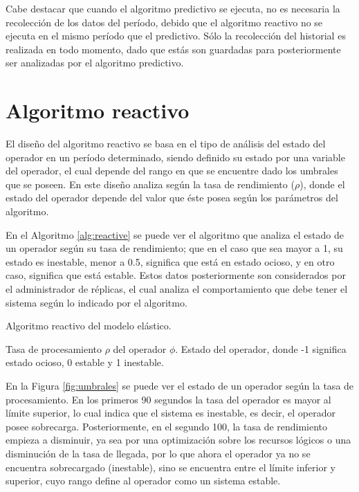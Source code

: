 Cabe destacar que cuando el algoritmo predictivo se ejecuta, no es necesaria la recolección de los datos del período, debido que el algoritmo reactivo no se ejecuta en el mismo período que el predictivo. Sólo la recolección del historial es realizada en todo momento, dado que estás son guardadas para posteriormente ser analizadas por el algoritmo predictivo.

\section{Algoritmo reactivo}
El diseño del algoritmo reactivo se basa en el tipo de análisis del estado del operador en un período determinado, siendo definido su estado por una variable del operador, el cual depende del rango en que se encuentre dado los umbrales que se poseen. En este diseño analiza según la tasa de rendimiento ($\rho$), donde el estado del operador depende del valor que éste posea según los parámetros del algoritmo.

En el Algoritmo \ref{alg:reactive} se puede ver el algoritmo que analiza el estado de un operador según su tasa de rendimiento; que en el caso que sea mayor a 1, su estado es inestable, menor a 0.5, significa que está en estado ocioso, y en otro caso, significa que está estable. Estos datos posteriormente son considerados por el administrador de réplicas, el cual analiza el comportamiento que debe tener el sistema según lo indicado por el algoritmo.

\begin{algorithm}[!ht]
	\caption{Algoritmo reactivo del modelo elástico.}
	\label{alg:reactive}
	\begin{algorithmic}[1]
	\REQUIRE Tasa de procesamiento $\rho$ del operador $\phi$.
	\ENSURE Estado del operador, donde -1 significa estado ocioso, 0 estable y 1 inestable.
	\ELSE
	\ENDIF
	\end{algorithmic}
\end{algorithm}

En la Figura \ref{fig:umbrales} se puede ver el estado de un operador según la tasa de procesamiento. En los primeros 90 segundos la tasa del operador es mayor al límite superior, lo cual indica que el sistema es inestable, es decir, el operador posee sobrecarga. Posteriormente, en el segundo 100, la tasa de rendimiento empieza a disminuir, ya sea por una optimización sobre los recursos lógicos o una disminución de la tasa de llegada, por lo que ahora el operador ya no se encuentra sobrecargado (inestable), sino se encuentra entre el límite inferior y superior, cuyo rango define al operador como un sistema estable.

